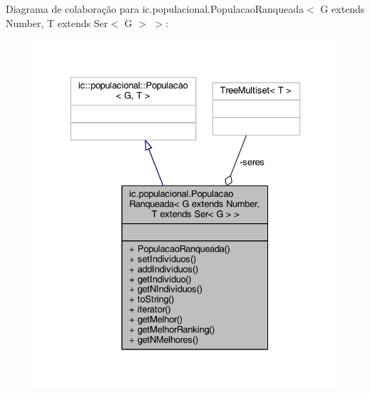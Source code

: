 Diagrama de colaboração para ic.\-populacional.\-Populacao\-Ranqueada$<$ G extends Number, T extends Ser$<$ G $>$ $>$\-:\nopagebreak
\begin{figure}[H]
\begin{center}
\leavevmode
\includegraphics[width=329pt]{classic_1_1populacional_1_1_populacao_ranqueada_3_01_g_01extends_01_number_00_01_t_01extends_01_305192478c95cfb876396273a03b4596}
\end{center}
\end{figure}
